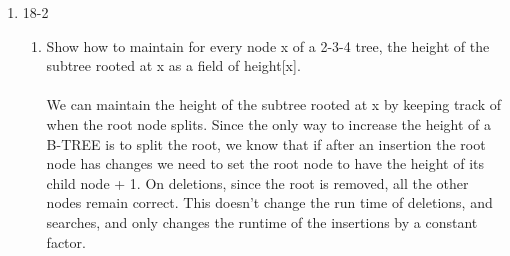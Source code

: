 \documentclass[11pt,fleqn]{article}
\begin{document}
\begin{enumerate}
\item
 18-2
\begin{enumerate}
\item Show how to maintain for every node x of a 2-3-4 tree, the height of the 
subtree rooted at x as a field of height[x].  \\
\\
We can maintain the height of the subtree rooted at x by keeping track of when the root node splits. Since the only way to increase the height of a B-TREE is to split the root, we know that if after an insertion the root node has changes we need to set the root node to have the height of its child node + 1. On deletions, since the root is removed, all the other nodes remain correct. This doesn't change the run time of deletions, and searches, and only changes the runtime of the insertions by a constant factor. \\
\\  

\end{enumerate}



\end{enumerate}
\end{document}
